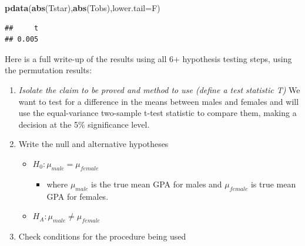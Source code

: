 \documentclass[]{book}
\newenvironment{Shaded}{\begin{snugshade}}{\end{snugshade}}
\newcommand{\KeywordTok}[1]{\textcolor[rgb]{0.13,0.29,0.53}{\textbf{{#1}}}}
\newcommand{\DataTypeTok}[1]{\textcolor[rgb]{0.13,0.29,0.53}{{#1}}}
\newcommand{\NormalTok}[1]{{#1}}
\providecommand{\tightlist}{%
  \setlength{\itemsep}{0pt}\setlength{\parskip}{0pt}}
\begin{document}
\begin{Shaded}
\begin{Highlighting}[]
\KeywordTok{pdata}\NormalTok{(}\KeywordTok{abs}\NormalTok{(Tstar),}\KeywordTok{abs}\NormalTok{(Tobs),}\DataTypeTok{lower.tail=}\NormalTok{F)}
\end{Highlighting}
\end{Shaded}

\begin{verbatim}
##     t 
## 0.005
\end{verbatim}

Here is a full write-up of the results using all 6+ hypothesis testing
steps, using the permutation results:

\begin{enumerate}
\def\labelenumi{\arabic{enumi}.}
\setcounter{enumi}{-1}
\item
  \emph{Isolate the claim to be proved and method to use (define a test
  statistic T)} We want to test for a difference in the means between
  males and females and will use the equal-variance two-sample t-test
  statistic to compare them, making a decision at the 5\% significance
  level.
\item
  Write the null and alternative hypotheses

  \begin{itemize}
  \item
    \(H_0: \mu_{male} = \mu_{female}\)

    \begin{itemize}
    \tightlist
    \item
      where \(\mu_{male}\) is the true mean GPA for males and
      \(\mu_{female}\) is true mean GPA for females.
    \end{itemize}
  \item
    \(H_A: \mu_{male} \ne \mu_{female}\)
  \end{itemize}
\item
  Check conditions for the procedure being used


\end{enumerate}
\end{document}
